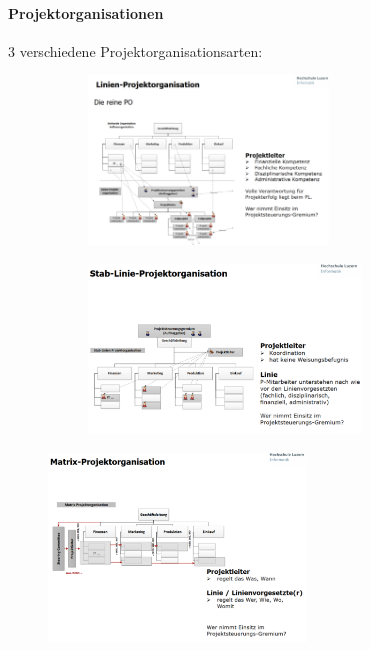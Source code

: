 \documentclass[a4paper]{article}
\begin{document}
			\paragraph{Projektorganisationen}
			
			3 verschiedene Projektorganisationsarten:
			
			\begin{figure}[!htb]
				\centering
				\begin{subfigure}{.45\textwidth}
					\centering
					\includegraphics[height=4.5cm]{img/pm/po_linien.png}
					\label{fig:pm_po_linie}
				\end{subfigure}
				\begin{subfigure}{.45\textwidth}
					\centering
					\includegraphics[height=4.5cm]{img/pm/po_stablinie.png}
					\label{fig:pm_po_stablinie}
				\end{subfigure}
			\end{figure}
		
			\begin{figure}[!htb]
				\centering
				\includegraphics[height=5cm]{img/pm/po_matrix.png}
				\label{fig:pm_po_matrix}
			\end{figure}
		
\end{document}
